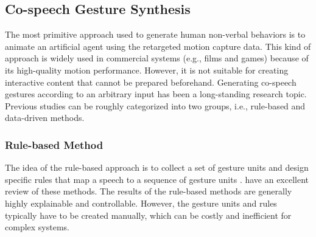 \documentclass[acmtog,authorversion]{acmart}
\begin{document}
\subsection{Co-speech Gesture Synthesis}
The most primitive approach used to generate human non-verbal behaviors is to animate an artificial agent using the retargeted motion capture data. This kind of approach is widely used in commercial systems (e.g., films and games) because of its high-quality motion performance. However, it is not suitable for creating interactive content that cannot be prepared beforehand. Generating co-speech gestures according to an arbitrary input has been a long-standing research topic. Previous studies can be roughly categorized into two groups, i.e., rule-based and data-driven methods.

\subsubsection{Rule-based Method}
The idea of the rule-based approach is to collect a set of gesture units and design specific rules that map a speech to a sequence of gesture units \cite{Kipp2004_Gesture, huang2012robot, softbank2018naoqi, cassell2004beat}. \citet{wagner2014gesture} have an excellent review of these methods. The results of the rule-based methods are generally highly explainable and controllable. However, the gesture units and rules typically have to be created manually, which can be costly and inefficient for complex systems.
\end{document}
